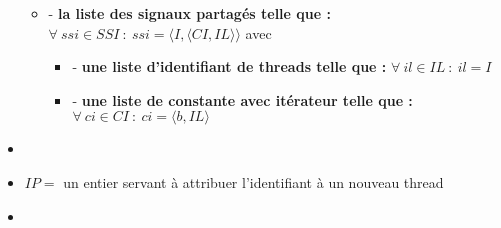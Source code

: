 \documentclass[10pt,a4paper]{report}
\begin{document}
\begin{itemize}
\begin{itemize}
			\item[] - \textbf{la liste des signaux partagés telle que :} $\forall~ssi \in SSI~:~ssi = \langle I,\langle CI,IL\rangle\rangle$ avec 
			\begin{itemize}
				\item[] - \textbf{une liste d'identifiant de threads telle que :} $\forall~il \in IL~:~il = I$
				\item[] - \textbf{une liste de constante avec itérateur telle que :} $\forall~ci \in CI~:~ci = \langle b, IL\rangle$
			\end{itemize}
		\end{itemize}
		\item[]
		\item[] $IP =$ un entier servant à attribuer l'identifiant à un nouveau thread 
		\item[] 
	\end{itemize}
	\bigbreak
	
	\newpage
	
	
	
\end{document}
